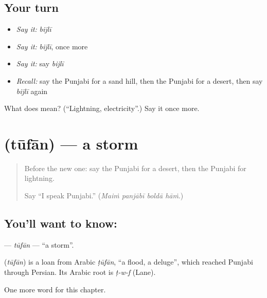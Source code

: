 \subsection*{Your turn}
\begin{itemize}
\raggedright
  \item \emph{Say it:} \emph{bijlī}
  \item \emph{Say it:} \emph{bijlī}, once more
  \item \emph{Say it:} say \emph{bijlī}
  \item \emph{Recall:} say the Punjabi for a sand hill, then the Punjabi for a desert, then say \emph{bijlī} again
\end{itemize}

\begin{tcolorbox}[breakable,colback=teal!4,colframe=teal!35!black,title={Before you move on}]
What does  mean? (\textquotedblleft{}Lightning, electricity\textquotedblright{}.) Say it once more.
\end{tcolorbox}
\section[\texorpdfstring{\pa{ਤੂਫ਼ਾਨ} (tūfān)}{ਤੂਫ਼ਾਨ (tūfān)}]{ (tūfān) — a storm}

\label{lesson:PA-C128-tufan}



\begin{quote}
Before the new one: say the Punjabi for a desert, then the Punjabi for lightning.

Say \textquotedblleft{}I speak Punjabi.\textquotedblright{} (\emph{Maiṁ panjābī boldā hāṁ}.)
\end{quote}

\subsection*{You'll want to know: }
\textbf{} — \emph{tūfān} — \textquotedblleft{}a storm\textquotedblright{}.

\begin{cousinweb}
\textbf{} (\emph{tūfān}) is a loan from Arabic \emph{ṭūfān}, \textquotedblleft{}a flood, a deluge\textquotedblright{}, which reached Punjabi through Persian. Its Arabic root is \emph{ṭ-w-f} (Lane).
\end{cousinweb}

\begin{grammarlens}[title={What you've built}]
One more word for this chapter.
\end{grammarlens}

